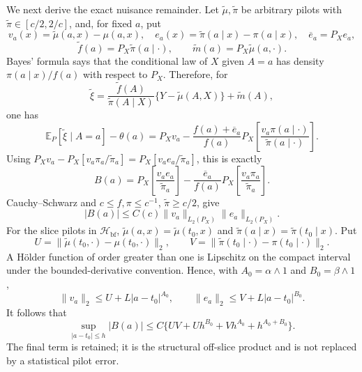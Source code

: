 We next derive the exact nuisance remainder. Let \(\widetilde\mu,\widetilde\pi\) be arbitrary pilots with \(\widetilde\pi\in[c/2,2/c]\), and, for fixed \(a\), put
\[
v_a(x)=\widetilde\mu(a,x)-\mu(a,x),\quad e_a(x)=\widetilde\pi(a\mid x)-\pi(a\mid x),\quad \overline e_a=P_Xe_a,
\]
\[
\widetilde f(a)=P_X\widetilde\pi(a\mid\cdot),\qquad \widetilde m(a)=P_X\widetilde\mu(a,\cdot).
\]
Bayes' formula says that the conditional law of \(X\) given \(A=a\) has density \(\pi(a\mid x)/f(a)\) with respect to \(P_X\). Therefore, for
\[
\widetilde\xi=\frac{\widetilde f(A)}{\widetilde\pi(A\mid X)}\{Y-\widetilde\mu(A,X)\}+\widetilde m(A),
\]
one has
\[
\mathbb E_P[\widetilde\xi\mid A=a]-\theta(a)
=P_Xv_a-\frac{f(a)+\overline e_a}{f(a)}P_X\left[\frac{v_a\pi(a\mid\cdot)}{\widetilde\pi(a\mid\cdot)}\right].
\]
Using \(P_Xv_a-P_X[v_a\pi_a/\widetilde\pi_a]=P_X[v_ae_a/\widetilde\pi_a]\), this is exactly
\[
B(a)=P_X\left[\frac{v_ae_a}{\widetilde\pi_a}\right]-\frac{\overline e_a}{f(a)}P_X\left[\frac{v_a\pi_a}{\widetilde\pi_a}\right].
\]
Cauchy--Schwarz and \(c\le f,\pi\le c^{-1}\), \(\widetilde\pi\ge c/2\), give
\[
|B(a)|\le C(c)\|v_a\|_{L_2(P_X)}\|e_a\|_{L_2(P_X)}.
\]
For the slice pilots in \(\mathcal H_{\mathrm{bf}}\), \(\widetilde\mu(a,x)=\widetilde\mu(t_0,x)\) and \(\widetilde\pi(a\mid x)=\widetilde\pi(t_0\mid x)\). Put
\[
U=\|\widetilde\mu(t_0,\cdot)-\mu(t_0,\cdot)\|_2,\qquad
V=\|\widetilde\pi(t_0\mid\cdot)-\pi(t_0\mid\cdot)\|_2.
\]
A Hölder function of order greater than one is Lipschitz on the compact interval under the bounded-derivative convention. Hence, with \(A_0=\alpha\wedge1\) and \(B_0=\beta\wedge1\),
\[
\|v_a\|_2\le U+L|a-t_0|^{A_0},\qquad
\|e_a\|_2\le V+L|a-t_0|^{B_0}.
\]
It follows that
\[
\sup_{|a-t_0|\le h}|B(a)|\le C\{UV+Uh^{B_0}+Vh^{A_0}+h^{A_0+B_0}\}.
\]
The final term is retained; it is the structural off-slice product and is not replaced by a statistical pilot error.

